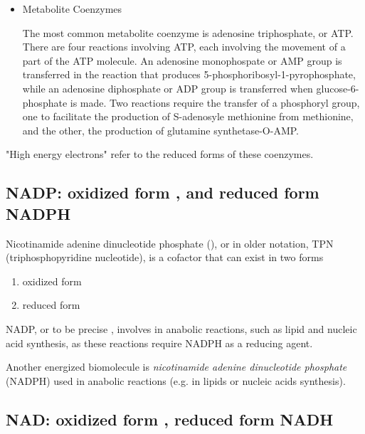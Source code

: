 \begin{itemize}
  \item Metabolite Coenzymes

The most common metabolite coenzyme is adenosine triphosphate, or ATP. There are
four reactions involving ATP, each involving the movement of a part of the ATP
molecule. An adenosine monophospate or AMP group is transferred in the reaction
that produces 5-phosphoribosyl-1-pyrophosphate, while an adenosine diphosphate
or ADP group is transferred when glucose-6-phosphate is made. Two reactions
require the transfer of a phosphoryl group, one to facilitate the production of
S-adenosyle methionine from methionine, and the other, the production of
glutamine synthetase-O-AMP.
 
\end{itemize}
"High energy electrons" refer to the reduced forms of these coenzymes.

\subsection{NADP: oxidized form , and reduced form NADPH}
\label{sec:NADP}
\label{sec:NADP+}
\label{sec:NADPH}

Nicotinamide adenine dinucleotide phosphate (), or in older notation,
TPN (triphosphopyridine nucleotide), is a cofactor that can exist in two forms
\begin{enumerate}
  \item oxidized form 
  
  \item reduced form 
\end{enumerate}

NADP, or to be precise , involves in anabolic
reactions, such as lipid and nucleic acid synthesis, as these reactions require
NADPH as a reducing agent. 

Another energized biomolecule is {\it nicotinamide adenine dinucleotide
phosphate} (NADPH) used in anabolic reactions (e.g. in lipids or nucleic acids
synthesis).  



\subsection{NAD: oxidized form , reduced form NADH}
\label{sec:NAD}
\label{sec:Nicotinamide-adenine-dinucleotide}
\label{sec:NAD+}

